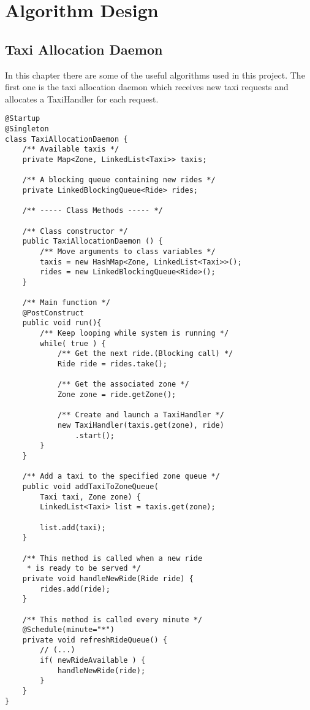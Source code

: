 \pagebreak
\section{Algorithm Design}
\label{sec:algorithm}

\subsection{Taxi Allocation Daemon}
In this chapter there are some of the useful algorithms used in this project.
The first one is the taxi allocation daemon which receives 
new taxi requests and allocates a TaxiHandler for each request.

\lstset{
language=Java,
numbersep=10pt,
numbers=left,
frame=single,
}
\begin{lstlisting}[caption={Taxi allocation daemon}]
@Startup
@Singleton
class TaxiAllocationDaemon {
    /** Available taxis */
    private Map<Zone, LinkedList<Taxi>> taxis;

    /** A blocking queue containing new rides */
    private LinkedBlockingQueue<Ride> rides;

    /** ----- Class Methods ----- */

    /** Class constructor */
    public TaxiAllocationDaemon () { 
        /** Move arguments to class variables */
        taxis = new HashMap<Zone, LinkedList<Taxi>>();
        rides = new LinkedBlockingQueue<Ride>();
    }

    /** Main function */
    @PostConstruct
    public void run(){
        /** Keep looping while system is running */
        while( true ) {
            /** Get the next ride.(Blocking call) */
            Ride ride = rides.take();

            /** Get the associated zone */
            Zone zone = ride.getZone();

            /** Create and launch a TaxiHandler */
            new TaxiHandler(taxis.get(zone), ride)
                .start(); 
        }
    }

    /** Add a taxi to the specified zone queue */
    public void addTaxiToZoneQueue(
        Taxi taxi, Zone zone) {
        LinkedList<Taxi> list = taxis.get(zone);

        list.add(taxi);
    }

    /** This method is called when a new ride
     * is ready to be served */
    private void handleNewRide(Ride ride) {
        rides.add(ride);
    }

    /** This method is called every minute */
    @Schedule(minute="*")
    private void refreshRideQueue() {
        // (...) 
        if( newRideAvailable ) {
            handleNewRide(ride);
        }
    }
}
\end{lstlisting}
\pagebreak

